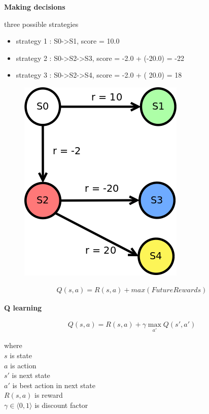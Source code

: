 \documentclass[xcolor=dvipsnames]{beamer}
\begin{document}
\begin{frame}{\bf Making decisions}

three possible strategies
\begin{itemize}
  \item strategy 1 : S0->S1, score = 10.0
  \item strategy 2 : S0->S2->S3, score = -2.0 + (-20.0) = -22
  \item strategy 3 : S0->S2->S4, score = -2.0 + ( 20.0) =  18
\end{itemize}

  \begin{figure}
    \includegraphics[scale=0.22]{../../diagrams/rl_trap.png}
  \end{figure}

  \begin{align*}
    Q(s, a) = R(s, a) + max(FutureRewards)
  \end{align*}

\end{frame}


\begin{frame}{\bf Q learning}

\begin{align*}
Q(s, a) = R(s, a) + \gamma \max \limits_{a'} Q(s', a')
\end{align*}

where \\
$s$ is state \\
$a$ is action \\
$s'$ is next state \\
$a'$ is best action in next state \\
$R(s, a)$ is reward \\
$\gamma \in \langle 0, 1 \rangle$ is discount factor \\

\end{frame}
\end{document}
